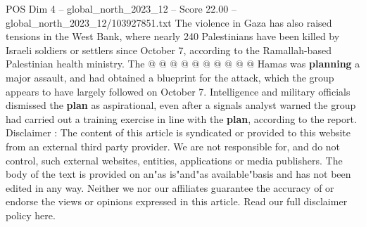 \begin{textsample}{POS Dim 4 – global\_north\_2023\_12 – Score 22.00 – global\_north\_2023\_12/103927851.txt}
The violence in Gaza has also raised tensions in the West Bank, where nearly 240 Palestinians have been killed by Israeli soldiers or settlers since October 7, according to the Ramallah-based Palestinian health ministry.
The @ @ @ @ @ @ @ @ @ @ Hamas was \textbf{planning} a major assault, and had obtained a blueprint for the attack, which the group appears to have largely followed on October 7.
Intelligence and military officials dismissed the \textbf{plan} as aspirational, even after a signals analyst warned the group had carried out a training exercise in line with the \textbf{plan}, according to the report.
Disclaimer : The content of this article is syndicated or provided to this website from an external third party provider.
We are not responsible for, and do not control, such external websites, entities, applications or media publishers.
The body of the text is provided on an"as is"and"as available"basis and has not been edited in any way.
Neither we nor our affiliates guarantee the accuracy of or endorse the views or opinions expressed in this article.
Read our full disclaimer policy here.

\end{textsample}
